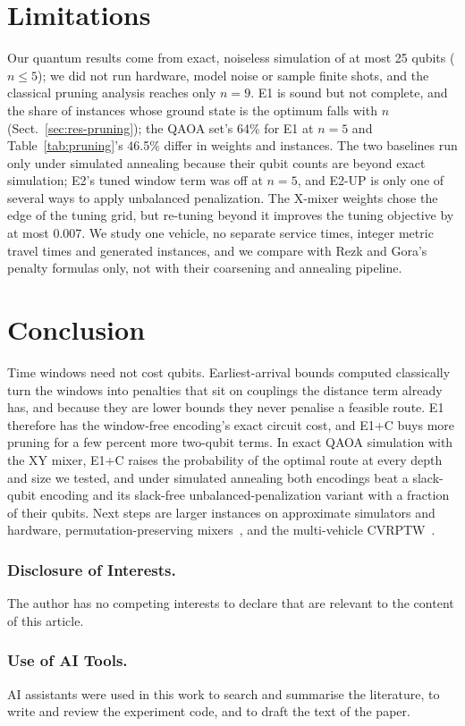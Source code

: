 \section{Limitations}\label{sec:limits}
Our quantum results come from exact, noiseless simulation of at most 25 qubits ($n\le5$); we
did not run hardware, model noise or sample finite shots, and the classical pruning analysis
reaches only $n=9$. E1 is sound but not complete, and the share of instances whose ground state is the optimum
falls with $n$ (Sect.~\ref{sec:res-pruning}); the QAOA set's 64\% for E1 at $n=5$ and
Table~\ref{tab:pruning}'s 46.5\% differ in weights and instances. The two baselines run only under simulated
annealing because their qubit counts are beyond exact simulation; E2's tuned window term was off
at $n=5$, and E2-UP is only one of several ways to apply unbalanced penalization. The X-mixer
weights chose the edge of the tuning grid, but re-tuning beyond it improves the tuning objective
by at most 0.007. We study one vehicle, no separate service times, integer metric travel times
and generated instances, and we compare with Rezk and Gora's penalty formulas only, not with
their coarsening and annealing pipeline.

\section{Conclusion}\label{sec:conclusion}
Time windows need not cost qubits. Earliest-arrival bounds computed classically turn the windows
into penalties that sit on couplings the distance term already has, and because they are lower
bounds they never penalise a feasible route. E1 therefore has the window-free encoding's exact
circuit cost, and E1+C buys more pruning for a few percent more two-qubit terms. In exact QAOA
simulation with the XY mixer, E1+C raises the probability of the optimal route at every depth
and size we tested, and under simulated annealing both encodings beat a slack-qubit encoding and
its slack-free unbalanced-penalization variant with a fraction of their qubits. Next steps are
larger instances on approximate simulators and hardware, permutation-preserving
mixers~\cite{hadfield2019qaoa}, and the multi-vehicle CVRPTW~\cite{rezk2026gnn}.

\subsubsection*{Disclosure of Interests.} The author has no competing interests to declare that
are relevant to the content of this article.

\subsubsection*{Use of AI Tools.} AI assistants were used in this work to search and summarise
the literature, to write and review the experiment code, and to draft the text of the paper.
